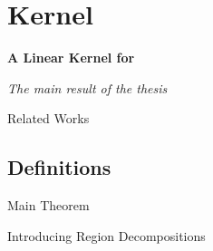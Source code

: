 \section{Kernel}

\begin{frame}[c]{}
    \begin{center}
        \textbf{A Linear Kernel for \psdom}

        \textit{The main result of the thesis}
    \end{center}
\end{frame}



\begin{frame}[c]{Related Works}
    \centering
\end{frame}


\subsection{Definitions}

\begin{frame}[c]{Main Theorem}

\end{frame}

\begin{frame}[c]{Introducing Region Decompositions}

\end{frame}



